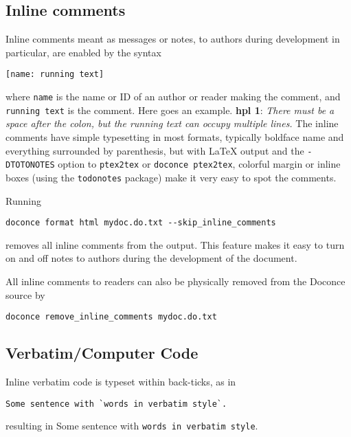 \documentclass[%
oneside,                 %
final,                   %
10pt]{article}
\newcommand{\shortinlinecomment}[3]{{\bf #1}: \emph{#2}}
\begin{document}
\subsection{Inline comments}

Inline comments meant as messages or notes, to authors during development
in particular,
are enabled by the syntax
\begin{Verbatim}[numbers=none,fontsize=\fontsize{9pt}{9pt},baselinestretch=0.85,xleftmargin=0mm]
[name: running text]
\end{Verbatim}
where \Verb!name! is the name or ID of an author or reader making the comment,
and \Verb!running text! is the comment. Here goes an example.
\shortinlinecomment{hpl 1}{ There must be a space after the colon,
but the running text can occupy multiple lines. }{ There must be a }
The inline comments have simple typesetting in most formats, typically boldface
name and everything surrounded by parenthesis, but with {\LaTeX}
output and the \Verb!-DTOTONOTES! option to \Verb!ptex2tex! or \Verb!doconce ptex2tex!,
colorful margin or inline boxes (using the \Verb!todonotes! package)
make it very easy to spot the comments.

Running
\begin{Verbatim}[numbers=none,fontsize=\fontsize{9pt}{9pt},baselinestretch=0.85,xleftmargin=0mm]
doconce format html mydoc.do.txt --skip_inline_comments
\end{Verbatim}
removes all inline comments from the output. This feature makes it easy
to turn on and off notes to authors during the development of the document.

All inline comments to readers can also be physically
removed from the Doconce source by
\begin{Verbatim}[numbers=none,fontsize=\fontsize{9pt}{9pt},baselinestretch=0.85,xleftmargin=0mm]
doconce remove_inline_comments mydoc.do.txt
\end{Verbatim}

\subsection{Verbatim/Computer Code}

Inline verbatim code is typeset within back-ticks, as in
\begin{Verbatim}[numbers=none,fontsize=\fontsize{9pt}{9pt},baselinestretch=0.85,xleftmargin=0mm]
Some sentence with `words in verbatim style`.
\end{Verbatim}
resulting in Some sentence with \Verb!words in verbatim style!.
\end{document}
